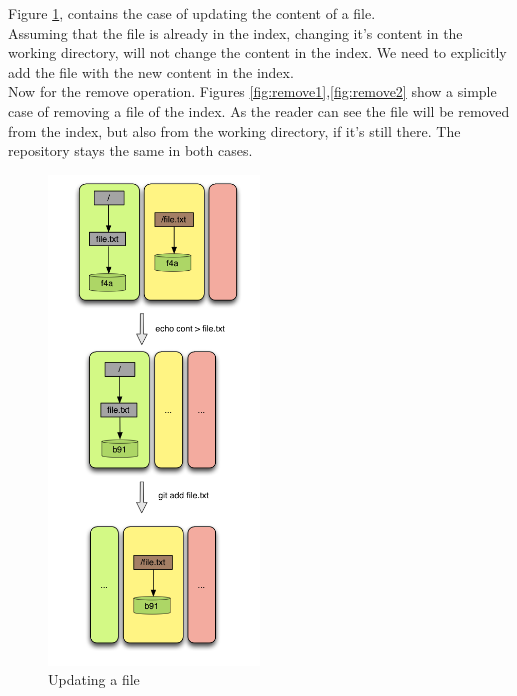 Figure \ref{fig:update1}, contains the case of updating the content of a file.
\\
Assuming that the file is already in the index, changing it's content in the 
working directory, will not change the content in the index. We need to 
explicitly add the file with the new content in the index. \\ 

Now for the remove operation. Figures \ref{fig:remove1},\ref{fig:remove2} 
show a simple case of
removing a file of the index. As the reader can see the file will be
removed from the index, but also from the working directory, if it's still
there. The repository stays the same in both cases.

\begin{figure}[!h]
   \centering
   \includegraphics[width=0.5\textwidth]{images/update1.png}
   \caption{Updating a file}\label{fig:update1}
\end{figure}

